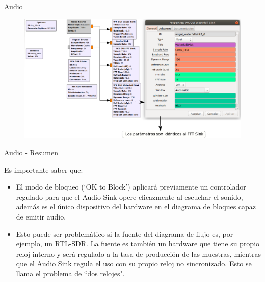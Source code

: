 \begin{frame}{Audio}

\begin{figure}

\begin{center}
\vspace{-8mm}
\includegraphics[width=1.05\textwidth]{lab3/pdf/lab3_4.pdf}
\end{center}
\end{figure}

\end{frame}

\begin{frame}{Audio - Resumen}

Es importante saber que:\\
\begin{itemize}
    \item
    {El modo de bloqueo (‘OK to Block’) aplicará previamente un controlador regulado para que el Audio Sink opere eficazmente al escuchar el sonido, además es el único dispositivo del hardware en el diagrama de bloques capaz de emitir audio.}
    \item
    {Esto puede ser problemático si la fuente del diagrama de flujo es, por ejemplo, un RTL-SDR. La fuente es también un hardware que tiene su propio reloj interno y será regulado a la tasa de producción de las muestras, mientras que el Audio Sink regula el uso con su propio reloj no sincronizado. Esto se llama el problema de “dos relojes".}
\end{itemize}
\end{frame}

